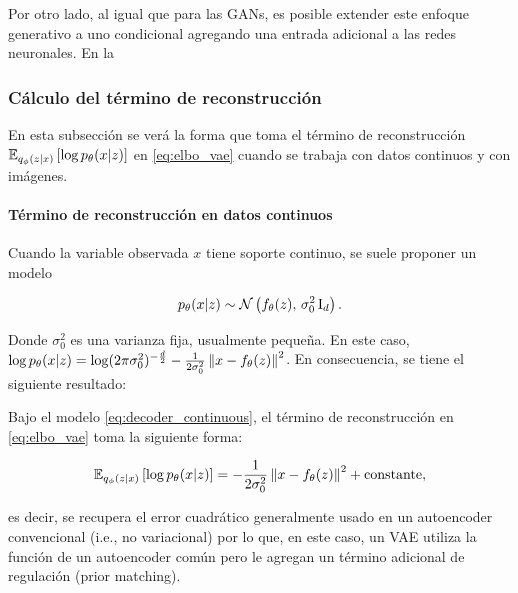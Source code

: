 Por otro lado, al igual que para las GANs, es posible extender este enfoque generativo a uno condicional agregando una entrada adicional a las redes neuronales. En la


\subsubsection{Cálculo del término de reconstrucción}

En esta subsección se verá la forma que toma el término de reconstrucción $\mathbb{E}_{q_\phi(z|x)}\left[\log p_\theta(x|z)\right]$ en \eqref{eq:elbo_vae} cuando se trabaja con datos continuos y con imágenes.

\paragraph{Término de reconstrucción en datos continuos}

Cuando la variable observada $x$ tiene soporte continuo, se suele proponer un modelo

\begin{equation}
    \label{eq:decoder_continuous}
	p_\theta(x|z)\sim\mathcal{N}\left(f_\theta(z),\,\sigma_0^2\operatorname{I}_{d}\right).
\end{equation}

Donde $\sigma_0^2$ es una varianza fija, usualmente pequeña. En este caso, $\log p_\theta(x|z) = \log (2\pi\sigma_0^2)^{-\frac{d}{2}} - \frac{1}{2\sigma_0^2}\left\lVert x-f_\theta(z) \right\rVert^2$. En consecuencia, se tiene el siguiente resultado:

\begin{prop}
	Bajo el modelo \eqref{eq:decoder_continuous}, el término de reconstrucción en \eqref{eq:elbo_vae} toma la siguiente forma:

	\begin{equation*}
		\mathbb{E}_{q_\phi(z|x)}\left[\log p_\theta(x|z)\right] = -\frac{1}{2\sigma_0^2} \left\lVert x-f_\theta(z) \right\rVert^2 + \operatorname{constante},
	\end{equation*}

	es decir, se recupera el error cuadrático generalmente usado en un autoencoder convencional (i.e., no variacional) por lo que, en este caso, un VAE utiliza la función de un autoencoder común pero le agregan un término adicional de regulación (prior matching).
\end{prop}

